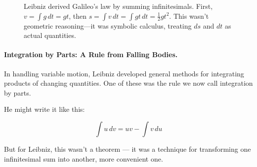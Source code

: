 \begin{figure}[H]
\centering
{}
\caption{Leibniz derived Galileo’s law by summing infinitesimals. First, $v = \int g\,dt = gt$, then $s = \int v\,dt = \int gt\,dt = \frac{1}{2}gt^2$. This wasn’t geometric reasoning—it was symbolic calculus, treating $ds$ and $dt$ as actual quantities.}
\end{figure}


\paragraph{Integration by Parts: A Rule from Falling Bodies.} In handling variable motion, Leibniz developed general methods for integrating products of changing quantities. One of these was the rule we now call integration by parts.

He might write it like this:

\[
\int u\,dv = u v - \int v\,du
\]

But for Leibniz, this wasn’t a theorem — it was a technique for transforming one infinitesimal sum into another, more convenient one.

